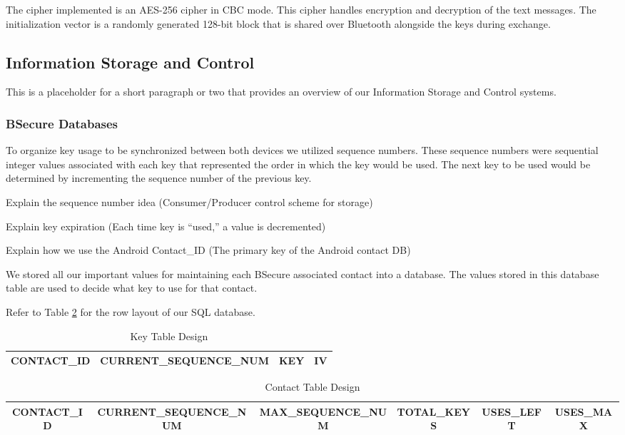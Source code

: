 The cipher implemented is an AES-256 cipher in CBC mode. This cipher handles encryption and
decryption of the text messages. The initialization vector is a randomly generated 128-bit block that
is shared over Bluetooth alongside the keys during exchange.

\subsection{Information Storage and Control}
This is a placeholder for a short paragraph or two that provides an overview of our Information Storage and Control systems.

\subsubsection{BSecure Databases}
To organize key usage to be synchronized between both devices we utilized sequence numbers.
These sequence numbers were sequential integer values associated with each key that represented the
order in which the key would be used. The next key to be used would be determined by incrementing the sequence
number of the previous key.

Explain the sequence number idea (Consumer/Producer control scheme for storage)

Explain key expiration (Each time key is ``used,'' a value is decremented)

Explain how we use the Android Contact\_ID (The primary key of the Android contact DB)

We stored all our important values for maintaining each BSecure associated contact
into a database. The values stored in this database table are used to decide what key to use for that
contact.

Refer to Table \ref{table:contacttable} for the row layout of our SQL database.

\begin{table}
\centering
\caption{Key Table Design}
\label{table:contacttable}
\begin{tabular}{|c|c|c|c|} \hline
CONTACT\_ID&CURRENT\_SEQUENCE\_NUM&KEY&IV\\ \hline\end{tabular}
\end{table}

\begin{table}
\centering
\caption{Contact Table Design}
\label{table:contacttable}
\begin{tabular}{|c|c|c|c|c|c|} \hline
CONTACT\_ID&CURRENT\_SEQUENCE\_NUM&MAX\_SEQUENCE\_NUM&TOTAL\_KEYS&USES\_LEFT&USES\_MAX\\ \hline\end{tabular}
\end{table}


